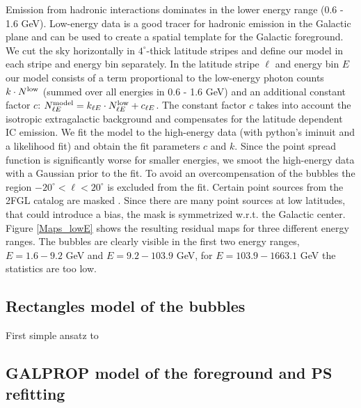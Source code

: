 Emission from hadronic interactions dominates in the lower energy range (0.6 - 1.6 GeV). Low-energy \Fermi data is a good tracer for hadronic emission in the Galactic plane and can be used to create a spatial template for the Galactic foreground. \\
We cut the sky horizontally in $4^\circ$-thick latitude stripes and define our model in each stripe and energy bin separately. In the latitude stripe $\ell$ and energy bin $E$ our model consists of a term proportional to the low-energy photon counts $k \cdot N^{\text{low}}$ (summed over all energies in 0.6 - 1.6 GeV) and an additional constant factor $c$: $N^{\text{model}}_{\ell E} = k_{\ell E} \cdot N^{\text{low}}_{\ell E} + c_{\ell E}$. The constant factor $c$ takes into account the isotropic extragalactic background and compensates for the latitude dependent IC emission. We fit the model to the high-energy \Fermi data (with python's iminuit and a likelihood fit) and obtain the fit parameters $c$ and $k$. Since the point spread function is significantly worse for smaller energies, we smoot the high-energy data with a Gaussian prior to the fit. To avoid an overcompensation of the \Fermi bubbles the region $-20^\circ < \ell < 20^\circ$ is excluded from the fit. Certain point sources from the 2FGL catalog are masked . Since there are many point sources at low latitudes, that could introduce a bias, the mask is symmetrized w.r.t. the Galactic center. \\
Figure \ref{Maps_lowE} shows the resulting residual maps for three different energy ranges. The \Fermi bubbles are clearly visible in the first two energy ranges, $E = 1.6 - 9.2$ GeV and $E = 9.2 - 103.9$ GeV, for $E = 103.9 - 1663.1$ GeV the statistics are too low.  


\subsection{Rectangles model of the bubbles}
First simple ansatz to 

\subsection{GALPROP model of the foreground and PS refitting}


